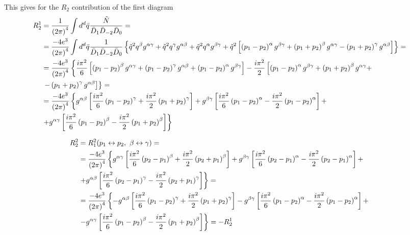 This gives for the $R_2$ contribution of the first diagram
\begin{align*}
R_2^1 & = \frac{1}{\left( 2\pi \right)^4} \int d^d\bar{q} \frac{\tilde{N}}{\bar{D}_1\bar{D}_{-2}\bar{D}_0} = & \\
& = \frac{-4e^3}{\left( 2\pi \right)^4} \int d^d \bar{q} \frac{1}{\bar{D}_1\bar{D}_{-2}\bar{D}_0} \left\lbrace \tilde{q}^2q^{\beta}g^{\alpha\gamma} + \tilde{q}^2q^{\gamma}g^{\alpha\beta} + \tilde{q}^2q^{\alpha}g^{\beta\gamma} + \tilde{q}^2 \left[ \left( p_1 - p_2 \right)^{\alpha} g^{\beta\gamma} + \left( p_1 + p_2 \right)^{\beta} g^{\alpha\gamma} - \left( p_1 + p_2 \right)^{\gamma} g^{\alpha\beta} \right] \right\rbrace = & \\
& = \frac{-4e^3}{\left( 2\pi \right)^4} \left\lbrace \frac{i\pi^2}{6} \left[ \left( p_1-p_2 \right)^{\beta}g^{\alpha\gamma} + \left( p_1-p_2 \right)^{\gamma}g^{\alpha\beta} + \left( p_1-p_2 \right)^{\alpha}g^{\beta\gamma} \right] - \frac{i\pi^2}{2} \left[ \left( p_1-p_2 \right)^{\alpha} g^{\beta\gamma} + \left( p_1+p_2 \right)^{\beta} g^{\alpha\gamma} + \right. \right. & \\
& \left. \left. - \left( p_1+p_2 \right)^{\gamma} g^{\alpha\beta} \right] \right\rbrace = & \\
& = \frac{-4e^3}{\left( 2\pi \right)^4} \left\lbrace g^{\alpha\beta} \left[ \frac{i\pi^2}{6} \left( p_1-p_2 \right)^{\gamma} + \frac{i\pi^2}{2} \left( p_1+p_2 \right)^{\gamma} \right] + g^{\beta\gamma} \left[ \frac{i\pi^2}{6} \left( p_1-p_2 \right)^{\alpha} - \frac{i\pi^2}{2} \left( p_1-p_2 \right)^{\alpha} \right] + \right. & \\
& \left. + g^{\alpha\gamma} \left[ \frac{i\pi^2}{6} \left( p_1-p_2 \right)^{\beta} - \frac{i\pi^2}{2} \left( p_1+p_2 \right)^{\beta} \right] \right\rbrace &
\end{align*}

\begin{align*}
R_2^2 & = R_1^2(p_1 \leftrightarrow p_2, \ \beta \leftrightarrow \gamma) = & \\
& = \frac{-4e^3}{\left( 2\pi \right)^4} \left\lbrace g^{\alpha\gamma} \left[ \frac{i\pi^2}{6} \left( p_2-p_1 \right)^{\beta} + \frac{i\pi^2}{2} \left( p_2+p_1 \right)^{\beta} \right] + g^{\beta\gamma} \left[ \frac{i\pi^2}{6} \left( p_2-p_1 \right)^{\alpha} - \frac{i\pi^2}{2} \left( p_2-p_1 \right)^{\alpha} \right] + \right. & \\
& \left. + g^{\alpha\beta} \left[ \frac{i\pi^2}{6} \left( p_2-p_1 \right)^{\gamma} - \frac{i\pi^2}{2} \left( p_2+p_1 \right)^{\gamma} \right] \right\rbrace = & \\
& = \frac{-4e^3}{\left( 2\pi \right)^4} \left\lbrace -g^{\alpha\beta} \left[ \frac{i\pi^2}{6} \left( p_1-p_2 \right)^{\gamma} + \frac{i\pi^2}{2} \left( p_1+p_2 \right)^{\gamma} \right] - g^{\beta\gamma} \left[ \frac{i\pi^2}{6} \left( p_1-p_2 \right)^{\alpha} - \frac{i\pi^2}{2} \left( p_1-p_2 \right)^{\alpha} \right] + \right. & \\
& \left. - g^{\alpha\gamma} \left[ \frac{i\pi^2}{6} \left( p_1-p_2 \right)^{\beta} - \frac{i\pi^2}{2} \left( p_1+p_2 \right)^{\beta} \right] \right\rbrace = -R_2^1 &
\end{align*}

